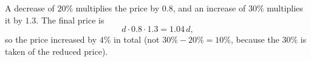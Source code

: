 A decrease of $20\%$ multiplies the price by $0.8$, and an increase of $30\%$ multiplies it by $1.3$. The final price is
\[
d\cdot0.8\cdot1.3=1.04\,d,
\]
so the price increased by $\boxed{4\%}$ in total (not $30\%-20\%=10\%$, because the $30\%$ is taken of the reduced price).
